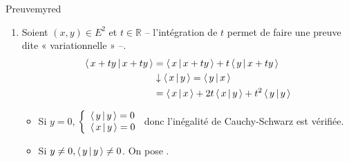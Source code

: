         \begin{demo}{Preuve}{myred}
            \begin{enumerate}[label=\textcolor{myred}{\textbf{(\alph*)}}]
                \item  Soient $(x,y) \in E^2$ et $t \in \mathbb{R}$ -- l’intégration de $t$ permet de faire une preuve dite « variationnelle » --.
                \begin{align*}
                    \left<\,x+ty\,\middle|\,x+ty\,\right> &= \left<\,x\,\middle|\,x+ty\,\right> + t\left<\,y\,\middle|\,x+ty\,\right> \\
                    &\downarrow \left<\,x\,\middle|\,y\,\right> = \left<\,y\,\middle|\,x\,\right> \\
                    &= \left<\,x\,\middle|\,x\,\right> + 2t\left<\,x\,\middle|\,y\,\right> + t^2 \left<\,y\,\middle|\,y\,\right>
                \end{align*}
                \begin{itemize}
                    \item Si $y = 0$, $\et{\spr{y}{y} = 0}{\spr{x}{y}=0}$ donc l’inégalité de Cauchy-Schwarz est vérifiée.
                    \item Si $y \neq 0, \left<\,y\,\middle|\,y\,\right> \neq 0$. On pose .
        

\end{itemize}
\end{enumerate}
\end{demo}
